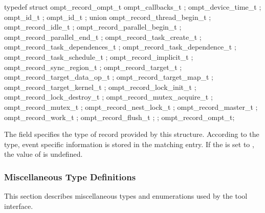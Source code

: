 \label{sec:ompt_record_ompt_t}

\begin{ccppspecific}
\begin{omptRecord}
typedef struct ompt_record_ompt_t {
  ompt_callbacks_t ;
  ompt_device_time_t ;
  ompt_id_t ;
  ompt_id_t ;
  union {
    ompt_record_thread_begin_t ;
    ompt_record_idle_t ;
    ompt_record_parallel_begin_t ;
    ompt_record_parallel_end_t ;
    ompt_record_task_create_t ;
    ompt_record_task_dependences_t ;
    ompt_record_task_dependence_t ;
    ompt_record_task_schedule_t ;
    ompt_record_implicit_t ;
    ompt_record_sync_region_t ;
    ompt_record_target_t ;
    ompt_record_target_data_op_t ;
    ompt_record_target_map_t ;
    ompt_record_target_kernel_t ;
    ompt_record_lock_init_t ;
    ompt_record_lock_destroy_t ;
    ompt_record_mutex_acquire_t ;
    ompt_record_mutex_t ;
    ompt_record_nest_lock_t ;
    ompt_record_master_t ;
    ompt_record_work_t ;
    ompt_record_flush_t ;
  } ;
} ompt_record_ompt_t;
\end{omptRecord}
\end{ccppspecific}


\descr
The field  specifies the type of record provided by this
structure.
According to the type, event specific information is stored in the matching
 entry.
\restrictions
If the  is set to , the value
of  is undefined.


\subsubsection{Miscellaneous Type Definitions}
\label{sec:ompt-types:misc}
This section describes miscellaneous types and enumerations used by the tool interface.

